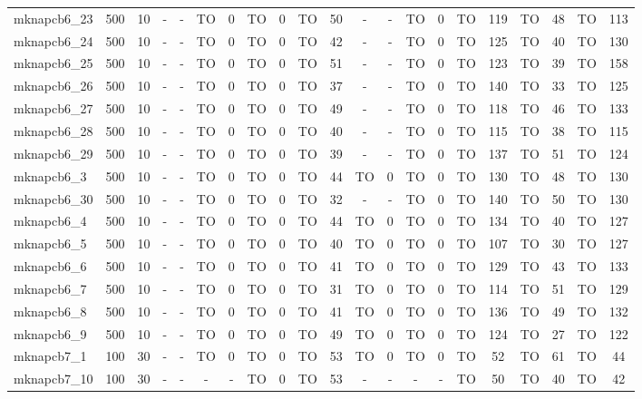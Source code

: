\begin{sidewaystable}[!ht]
{\begin{tabular}{lcccccccccccccccccccc}
mknapcb6\_23 & 500 & 10 &  - &  - & TO & 0 & TO & 0 & TO & 50 &  - &  - & TO & 0 & TO & 119 & TO & 48 & TO & 113 \\
mknapcb6\_24 & 500 & 10 &  - &  - & TO & 0 & TO & 0 & TO & 42 &  - &  - & TO & 0 & TO & 125 & TO & 40 & TO & 130 \\
mknapcb6\_25 & 500 & 10 &  - &  - & TO & 0 & TO & 0 & TO & 51 &  - &  - & TO & 0 & TO & 123 & TO & 39 & TO & 158 \\
mknapcb6\_26 & 500 & 10 &  - &  - & TO & 0 & TO & 0 & TO & 37 &  - &  - & TO & 0 & TO & 140 & TO & 33 & TO & 125 \\
mknapcb6\_27 & 500 & 10 &  - &  - & TO & 0 & TO & 0 & TO & 49 &  - &  - & TO & 0 & TO & 118 & TO & 46 & TO & 133 \\
mknapcb6\_28 & 500 & 10 &  - &  - & TO & 0 & TO & 0 & TO & 40 &  - &  - & TO & 0 & TO & 115 & TO & 38 & TO & 115 \\
mknapcb6\_29 & 500 & 10 &  - &  - & TO & 0 & TO & 0 & TO & 39 &  - &  - & TO & 0 & TO & 137 & TO & 51 & TO & 124 \\
mknapcb6\_3 & 500 & 10 &  - &  - & TO & 0 & TO & 0 & TO & 44 & TO & 0 & TO & 0 & TO & 130 & TO & 48 & TO & 130 \\
mknapcb6\_30 & 500 & 10 &  - &  - & TO & 0 & TO & 0 & TO & 32 &  - &  - & TO & 0 & TO & 140 & TO & 50 & TO & 130 \\
mknapcb6\_4 & 500 & 10 &  - &  - & TO & 0 & TO & 0 & TO & 44 & TO & 0 & TO & 0 & TO & 134 & TO & 40 & TO & 127 \\
mknapcb6\_5 & 500 & 10 &  - &  - & TO & 0 & TO & 0 & TO & 40 & TO & 0 & TO & 0 & TO & 107 & TO & 30 & TO & 127 \\
mknapcb6\_6 & 500 & 10 &  - &  - & TO & 0 & TO & 0 & TO & 41 & TO & 0 & TO & 0 & TO & 129 & TO & 43 & TO & 133 \\
mknapcb6\_7 & 500 & 10 &  - &  - & TO & 0 & TO & 0 & TO & 31 & TO & 0 & TO & 0 & TO & 114 & TO & 51 & TO & 129 \\
mknapcb6\_8 & 500 & 10 &  - &  - & TO & 0 & TO & 0 & TO & 41 & TO & 0 & TO & 0 & TO & 136 & TO & 49 & TO & 132 \\
mknapcb6\_9 & 500 & 10 &  - &  - & TO & 0 & TO & 0 & TO & 49 & TO & 0 & TO & 0 & TO & 124 & TO & 27 & TO & 122 \\
mknapcb7\_1 & 100 & 30 &  - &  - & TO & 0 & TO & 0 & TO & 53 & TO & 0 & TO & 0 & TO & 52 & TO & 61 & TO & 44 \\
mknapcb7\_10 & 100 & 30 &  - &  - &  - &  - & TO & 0 & TO & 53 &  - &  - &  - &  - & TO & 50 & TO & 40 & TO & 42 \\

\end{tabular}}
\end{sidewaystable}
